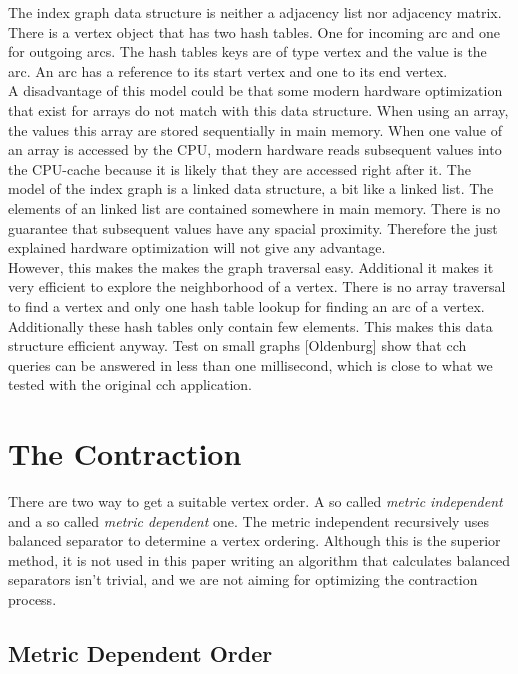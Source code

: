 \documentclass[11pt, rgb]{scrreprt}
\begin{document}
The index graph data structure is neither a adjacency list nor adjacency matrix. There is a vertex object that has two hash tables. One for incoming arc and one for outgoing arcs. The hash tables keys are of type vertex and the value is the arc. An arc has a reference to its start vertex and one to its end vertex. \\
A disadvantage of this model could be that some modern hardware optimization that exist for arrays do not match with this data structure. When using an array, the values this array are stored sequentially in main memory. When one value of an array is accessed by the CPU, modern hardware reads subsequent values into the CPU-cache because it is likely that they are accessed right after it. The model of the index graph is a linked data structure, a bit like a linked list. The elements of an linked list are contained somewhere in main memory. There is no guarantee that subsequent values have any spacial proximity. Therefore the just explained hardware optimization will not give any advantage. \\ %
However, this makes the makes the graph traversal easy. Additional it makes it very efficient to explore the neighborhood of a vertex. There is no array traversal to find a vertex and only one hash table lookup for finding an arc of a vertex. Additionally these hash tables only contain few elements. This makes this data structure efficient anyway. Test on small graphs [Oldenburg] show that cch queries can be answered in less than one millisecond, which is close to what we tested with the original cch application.

\section{The Contraction}

There are two way to get a suitable vertex order. A so called \textit{metric independent} and a so called \textit{metric dependent} one. The metric independent recursively uses balanced separator to determine a vertex ordering\cite{CCH}. Although this is the superior method, it is not used in this paper writing an algorithm that calculates balanced separators isn't trivial, and we are not aiming for optimizing the contraction process. 

\subsection{Metric Dependent Order}
\end{document}
